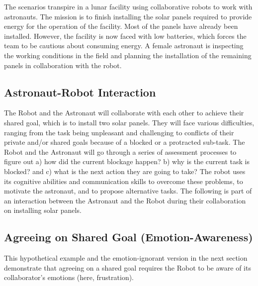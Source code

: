 The scenarios transpire in a lunar facility using collaborative robots to work
with astronauts. The mission is to finish installing the solar panels required
to provide energy for the operation of the facility. Most of the panels have
already been installed. However, the facility is now faced with low batteries,
which forces the team to be cautious about consuming energy. A female astronaut
is inspecting the working conditions in the field and planning the installation
of the remaining panels in collaboration with the robot.

\subsection{Astronaut-Robot Interaction}

The Robot and the Astronaut will collaborate with each other to achieve their
shared goal, which is to install two solar panels. They will face various
difficulties, ranging from the task being unpleasant and challenging to
conflicts of their private and/or shared goals because of a blocked or a
protracted sub-task. The Robot and the Astronaut will go through a series of
assessment processes to figure out a) how did the current blockage happen? b)
why is the current task is blocked? and c) what is the next action they are
going to take? The robot uses its cognitive abilities and communication skills
to overcome these problems, to motivate the astronaut, and to propose
alternative tasks. The following is part of an interaction between the Astronaut
and the Robot during their collaboration on installing solar panels.

\subsection{Agreeing on Shared Goal (Emotion-Awareness)}
\label{sec:exp1}

This hypothetical example and the emotion-ignorant version in the next section
demonstrate that agreeing on a shared goal requires the Robot to be aware of its
collaborator's emotions (here, frustration). 

